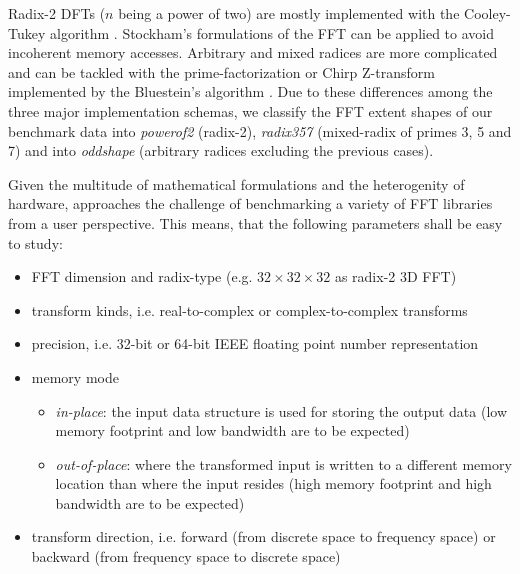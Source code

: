 Radix-2 DFTs ($n$ being a power of two) are mostly implemented with the Cooley-Tukey algorithm \cite{cooley1965algorithm}. Stockham's formulations of the FFT can be applied \cite{FFTW05} to avoid incoherent memory accesses. Arbitrary and mixed radices are more complicated and can be tackled with the prime-factorization or Chirp Z-transform implemented by the Bluestein's algorithm \cite{bluestein}. Due to these differences among the three major implementation schemas, we classify the FFT extent shapes of our benchmark data into \emph{powerof2} (radix-2), \emph{radix357} (mixed-radix of primes 3, 5 and 7) and into \emph{oddshape} (arbitrary radices excluding the previous cases). 

Given the multitude of mathematical formulations and the heterogenity of hardware, \gearshifft{} approaches the challenge of benchmarking a variety of FFT libraries from a user perspective. This means, that the following parameters shall be easy to study:

\begin{itemize}
\item FFT dimension and radix-type (e.g. $32{\times}32{\times}32$ as radix-2 3D FFT)
\item transform kinds, i.e. real-to-complex or complex-to-complex transforms
\item precision, i.e. 32-bit or 64-bit IEEE floating point number representation
\item memory mode
  \begin{itemize}
  \item \emph{in-place}: the input data structure is used for storing the output data (low memory footprint and low bandwidth are to be expected)
  \item \emph{out-of-place}:  where the transformed input is written to a different memory location than where the input resides (high memory footprint and high bandwidth are to be expected)
  \end{itemize}
\item transform direction, i.e. forward (from discrete space to frequency space) or backward (from frequency space to discrete space)
\end{itemize}
 
